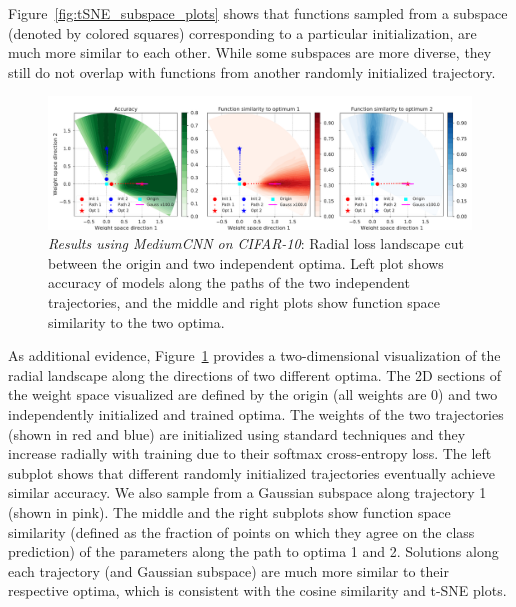 \documentclass{article}
\newcommand{\reducespaceafterfigure}{\vspace{-1em}} %
\begin{document}
Figure~\ref{fig:tSNE_subspace_plots} shows that functions sampled from a subspace (denoted by colored squares) corresponding to a particular initialization, are much more similar to each other. While some subspaces are more diverse, they still do not overlap with functions from another randomly initialized trajectory.  
%
%
%
%
%
%
%
%
%

\begin{figure}[ht]%
    \centering%
%
%
%
%
%
%
%
\includegraphics[width=\textwidth]{figures/landscape_plots_8953676.pdf}
     \reducespaceafterfigure
     \caption{\emph{Results using MediumCNN on CIFAR-10}: Radial loss landscape cut between the origin and two independent optima. %
     Left plot shows accuracy of models along the paths of the two independent trajectories, %
     and the middle and right plots show function space similarity to the two optima. }
    \label{fig:CNN_radial_cuts_trajectory}%
\end{figure}%


%
%
As additional evidence, Figure~\ref{fig:CNN_radial_cuts_trajectory} provides a two-dimensional visualization of the radial landscape along the directions of two different optima. The 2D sections of the weight space visualized are defined by the origin (all weights are 0) and two independently initialized and trained optima. The weights of the two trajectories (shown in red and blue) are initialized using standard techniques and they increase radially with training due to their softmax cross-entropy loss. The left subplot shows that different randomly initialized trajectories eventually achieve similar accuracy. We also sample from a Gaussian subspace along trajectory 1 (shown in pink). 
The middle and the right subplots show function space similarity (defined as the fraction of points on which they agree on the class prediction) of the parameters along the path to optima 1 and 2.  Solutions along each trajectory (and Gaussian subspace) are much more similar to their respective optima, which is consistent with the cosine similarity and t-SNE plots.  %
\end{document}
